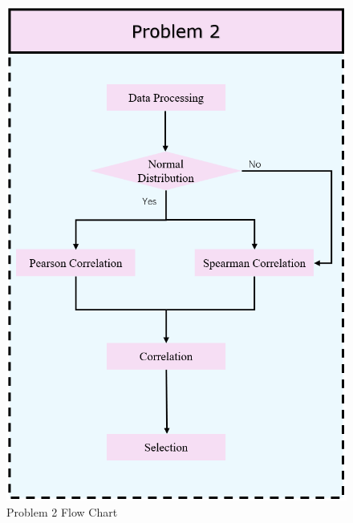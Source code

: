 \documentclass{swmcmthesis}
\begin{document}
\begin{figure}[h!t]
\begin{minipage}[t]{0.4\textwidth}
		\includegraphics[width=\textwidth]{Problem 2.png}
		\caption{Problem 2 Flow Chart}
	\end{minipage}
\end{figure}
\end{document}
